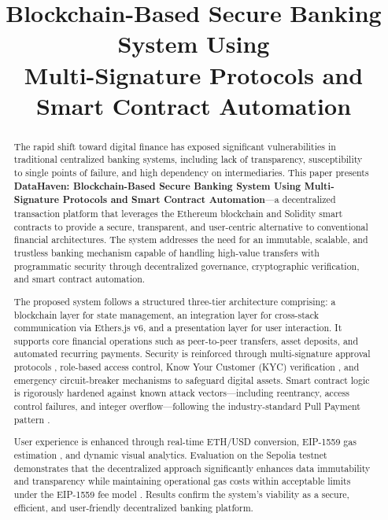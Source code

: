 \documentclass[conference]{IEEEtran}
\begin{document}
\title{Blockchain-Based Secure Banking System Using\\
Multi-Signature Protocols and Smart Contract Automation}

\author{
}

\maketitle

\begin{abstract}
The rapid shift toward digital finance has exposed significant vulnerabilities in
traditional centralized banking systems, including lack of transparency,
susceptibility to single points of failure, and high dependency on intermediaries.
This paper presents \textbf{DataHaven: Blockchain-Based Secure Banking System
Using Multi-Signature Protocols and Smart Contract Automation}—a decentralized
transaction platform that leverages the Ethereum blockchain and Solidity smart
contracts to provide a secure, transparent, and user-centric alternative to
conventional financial architectures. The system addresses the need for an
immutable, scalable, and trustless banking mechanism capable of handling
high-value transfers with programmatic security through decentralized
governance, cryptographic verification, and smart contract automation.

The proposed system follows a structured three-tier architecture comprising: a
blockchain layer for state management, an integration layer for cross-stack
communication via Ethers.js v6, and a presentation layer for user interaction.
It supports core financial operations such as peer-to-peer transfers, asset
deposits, and automated recurring payments. Security is reinforced through
multi-signature approval protocols \cite{ref2}, role-based access control,
Know Your Customer (KYC) verification \cite{ref20}, and emergency
circuit-breaker mechanisms \cite{ref9} to safeguard digital assets. Smart
contract logic is rigorously hardened against known attack vectors—including
reentrancy, access control failures, and integer overflow—following the
industry-standard Pull Payment pattern \cite{ref13}.

User experience is enhanced through real-time ETH/USD conversion, EIP-1559
gas estimation \cite{ref14}, and dynamic visual analytics. Evaluation on the
Sepolia testnet demonstrates that the decentralized approach significantly
enhances data immutability and transparency while maintaining operational gas
costs within acceptable limits under the EIP-1559 fee model \cite{ref10}.
Results confirm the system's viability as a secure, efficient, and
user-friendly decentralized banking platform.
\end{abstract}
\end{document}
